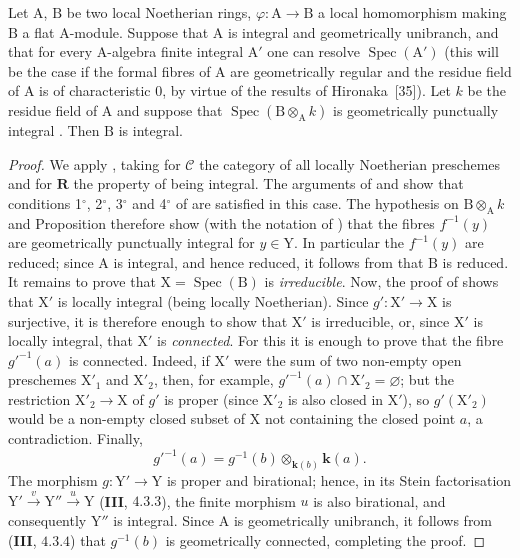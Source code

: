 \begin{corollary}[7.9.9]
\label{IV.7.9.9}
Let $\mathrm{A}$, $\mathrm{B}$ be two local Noetherian rings, $\varphi:\mathrm{A}\to\mathrm{B}$ a local homomorphism making $\mathrm{B}$ a flat $\mathrm{A}$-module. Suppose that $\mathrm{A}$ is integral and geometrically unibranch, and that for every $\mathrm{A}$-algebra finite integral $\mathrm{A}'$ one can resolve $\operatorname{Spec}(\mathrm{A}')$ (this will be the case if the formal fibres of $\mathrm{A}$ are geometrically regular and the residue field of $\mathrm{A}$ is of characteristic $0$, by virtue of the results of Hironaka~[35]). Let $k$ be the residue field of $\mathrm{A}$ and suppose that $\operatorname{Spec}(\mathrm{B}\otimes_\mathrm{A} k)$ is geometrically punctually integral . Then $\mathrm{B}$ is integral.
\end{corollary}

\begin{proof}
We apply , taking for $\mathcal{C}$ the category of all locally Noetherian preschemes and for $\boldsymbol{R}$ the property of being integral. The arguments of  and  show that conditions 1${}^\circ$, 2${}^\circ$, 3${}^\circ$ and 4${}^\circ$ of  are satisfied in this case. The hypothesis on $\mathrm{B}\otimes_\mathrm{A}k$ and Proposition  therefore show (with the notation of ) that the fibres $f^{-1}(y)$ are geometrically punctually integral for $y\in\mathrm{Y}$. In particular the $f^{-1}(y)$ are reduced; since $\mathrm{A}$ is integral, and hence reduced, it follows from  that $\mathrm{B}$ is reduced. It remains to prove that $\mathrm{X}=\operatorname{Spec}(\mathrm{B})$ is \emph{irreducible}. Now, the proof of  shows that $\mathrm{X}'$ is locally integral (being locally Noetherian). Since $g':\mathrm{X}'\to\mathrm{X}$ is surjective, it is therefore enough to show that $\mathrm{X}'$ is irreducible, or, since $\mathrm{X}'$ is locally integral, that $\mathrm{X}'$ is \emph{connected}. For this it is enough to prove that the fibre $g'^{-1}(a)$ is connected. Indeed, if $\mathrm{X}'$ were the sum of two non-empty open preschemes $\mathrm{X}'_1$ and $\mathrm{X}'_2$, then, for example, $g'^{-1}(a)\cap\mathrm{X}'_2=\varnothing$; but the restriction $\mathrm{X}'_2\to\mathrm{X}$ of $g'$ is proper (since $\mathrm{X}'_2$ is also closed in $\mathrm{X}'$), so $g'(\mathrm{X}'_2)$ would be a non-empty closed subset of $\mathrm{X}$ not containing the closed point $a$, a contradiction. Finally,
\[
  g'^{-1}(a)=g^{-1}(b)\otimes_{\boldsymbol{k}(b)}\boldsymbol{k}(a).
\]
The morphism $g:\mathrm{Y}'\to\mathrm{Y}$ is proper and birational; hence, in its Stein factorisation $\mathrm{Y}'\xrightarrow{v}\mathrm{Y}''\xrightarrow{u}\mathrm{Y}$ (\textbf{III}, $4.3.3$), the finite morphism $u$ is also birational, and consequently $\mathrm{Y}''$ is integral. Since $\mathrm{A}$ is geometrically unibranch, it follows from (\textbf{III}, $4.3.4$) that $g^{-1}(b)$ is geometrically connected, completing the proof.
\end{proof}

